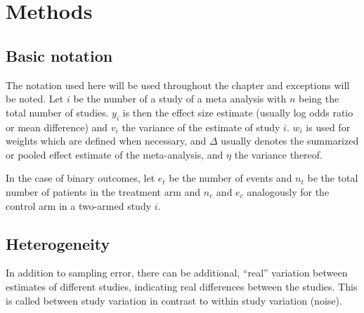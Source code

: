 \documentclass[11pt,a4paper,twoside]{book}\usepackage[]{graphicx}\usepackage[]{color}
\begin{document}
% 
% 






\chapter{Methods}

\section{Basic notation}
The notation used here will be used throughout the chapter and exceptions will be noted. Let $i$ be the number of a study of a meta analysis with $n$ being the total number of studies. $y_{i}$ is then the effect size estimate (usually log odds ratio or mean difference) and $v_{i}$ the variance of the estimate of study $i$. $w_{i}$ is used for weights which are defined when necessary, and $\Delta$ usually denotes the summarized or pooled effect estimate of the meta-analysis, and $\eta$ the variance thereof.

\vspace{0mm}
In the case of binary outcomes, let $e_{t}$ be the number of events and $n_{t}$ be the total number of patients in the treatment arm and $n_{c}$ and $e_{c}$ analogously for the control arm in a two-armed study $i$. 

\section{Heterogeneity}
In addition to sampling error, there can be additional, ``real'' variation between estimates of different studies, indicating real differences between the studies. This is called between study variation in contrast to within study variation (noise). 
\end{document}
